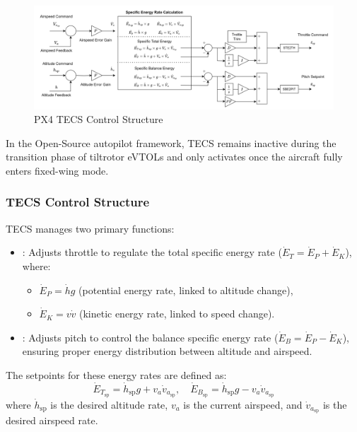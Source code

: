 \documentclass[journal,article,submit,pdftex,moreauthors]{Definitions/mdpi}
\begin{document}
\begin{figure}[H]
    \centering
    \includegraphics[width=1\linewidth]{figures/PX4_TECS_Structure.png}
    \caption{PX4 TECS Control Structure}
    \label{fig:enter-label}
\end{figure}
In the Open-Source autopilot framework, TECS remains inactive during the transition phase of tiltrotor eVTOLs and only activates once the aircraft fully enters fixed-wing mode.

\subsubsection{TECS Control Structure}
TECS manages two primary functions:
\begin{itemize}
    \item {}: Adjusts throttle to regulate the total specific energy rate (\(\dot{E}_T = \dot{E}_P + \dot{E}_K\)), where:
    \begin{itemize}
        \item \(\dot{E}_P = \dot{h}g\) (potential energy rate, linked to altitude change),
        \item \(\dot{E}_K = v\dot{v}\) (kinetic energy rate, linked to speed change).
    \end{itemize}
    \item {}: Adjusts pitch to control the balance specific energy rate (\(\dot{E}_B = \dot{E}_P - \dot{E}_K\)), ensuring proper energy distribution between altitude and airspeed.
\end{itemize}

The setpoints for these energy rates are defined as:
\begin{equation}
    \dot{E}_{T_{\text{sp}}} = \dot{h}_{\text{sp}}g + v_a\dot{v}_{a_{\text{sp}}}, \quad \dot{E}_{B_{\text{sp}}} = \dot{h}_{\text{sp}}g - v_a\dot{v}_{a_{\text{sp}}}
\end{equation}
where \(\dot{h}_{\text{sp}}\) is the desired altitude rate, \(v_a\) is the current airspeed, and \(\dot{v}_{a_{\text{sp}}}\) is the desired airspeed rate.
\end{document}

